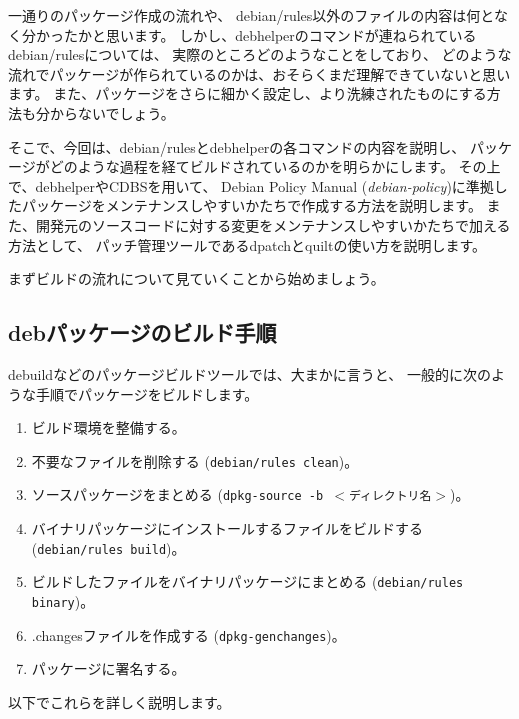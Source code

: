 \documentclass[mingoth,a4paper]{jsarticle}
\begin{document}
一通りのパッケージ作成の流れや、
debian/rules以外のファイルの内容は何となく分かったかと思います。
しかし、debhelperのコマンドが連ねられているdebian/rulesについては、
実際のところどのようなことをしており、
どのような流れでパッケージが作られているのかは、おそらくまだ理解できていないと思います。
また、パッケージをさらに細かく設定し、より洗練されたものにする方法も分からないでしょう。

そこで、今回は、debian/rulesとdebhelperの各コマンドの内容を説明し、
パッケージがどのような過程を経てビルドされているのかを明らかにします。
その上で、debhelperやCDBSを用いて、
Debian Policy Manual (\emph{debian-policy})に準拠したパッケージをメンテナンスしやすいかたちで作成する方法を説明します。
また、開発元のソースコードに対する変更をメンテナンスしやすいかたちで加える方法として、
パッチ管理ツールであるdpatchとquiltの使い方を説明します。

まずビルドの流れについて見ていくことから始めましょう。



\subsection{debパッケージのビルド手順}

debuildなどのパッケージビルドツールでは、大まかに言うと、
一般的に次のような手順でパッケージをビルドします。

\begin{enumerate}
 \item ビルド環境を整備する。
 \item 不要なファイルを削除する (\texttt{debian/rules clean})。
 \item ソースパッケージをまとめる (\texttt{dpkg-source -b $<$ディレクトリ名$>$})。
 \item バイナリパッケージにインストールするファイルをビルドする (\texttt{debian/rules build})。
 \item ビルドしたファイルをバイナリパッケージにまとめる (\texttt{debian/rules binary})。
 \item .changesファイルを作成する (\texttt{dpkg-genchanges})。
 \item パッケージに署名する。
\end{enumerate}

以下でこれらを詳しく説明します。
\end{document}
